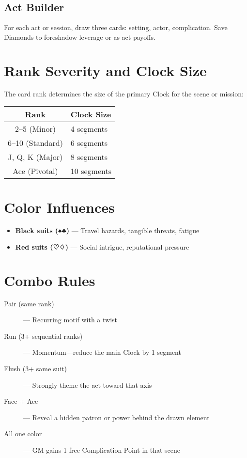 \subsection*{Act Builder}
For each act or session, draw three cards: setting, actor, complication. Save Diamonds to foreshadow leverage or as act payoffs.

\section{Rank Severity and Clock Size}

The card rank determines the size of the primary Clock for the scene or mission:

\begin{center}
\begin{tabular}{cl}
\toprule
\textbf{Rank} & \textbf{Clock Size} \\
\midrule
2–5 (Minor) & 4 segments \\
6–10 (Standard) & 6 segments \\
J, Q, K (Major) & 8 segments \\
Ace (Pivotal) & 10 segments \\
\bottomrule
\end{tabular}
\end{center}

\section{Color Influences}

\begin{itemize}
  \item \textbf{Black suits (♠♣)} — Travel hazards, tangible threats, fatigue
  \item \textbf{Red suits (♡♢)} — Social intrigue, reputational pressure
\end{itemize}

\section{Combo Rules}

\begin{description}
  \item[Pair (same rank)] — Recurring motif with a twist
  \item[Run (3+ sequential ranks)] — Momentum—reduce the main Clock by 1 segment
  \item[Flush (3+ same suit)] — Strongly theme the act toward that axis
  \item[Face + Ace] — Reveal a hidden patron or power behind the drawn element
  \item[All one color] — GM gains 1 free Complication Point in that scene
\end{description}


